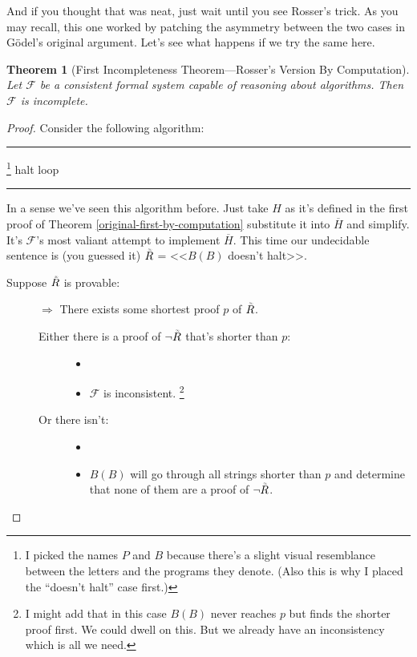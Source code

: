 \documentclass{article}
\newtheorem{theorem}{Theorem}
\newcommand{\F}{\ensuremath{\mathcal{F}}}
\newcommand{\iRosser}{\ensuremath{\accentset{\scalebox{0.35}{$\infty$}}{R}}}
\newenvironment{algo}{\begin{samepage}\medskip\hrule\begin{algorithmic}[H]}{\end{algorithmic}\hrule\medskip\end{samepage}}
\begin{document}
And if you thought that was neat, just wait until you see Rosser's trick. As you may recall, this one worked by patching the asymmetry between the two cases in Gödel's original argument. Let's see what happens if we try the same here.

\begin{theorem}[First Incompleteness Theorem---Rosser's Version By Computation]
Let $\F$ be a consistent formal system capable of reasoning about algorithms. Then $\F$ is incomplete.
\end{theorem}

\begin{proof}
Consider the following algorithm:
\begin{algo}
\footnote{I picked the names $P$ and $B$ because there's a slight visual resemblance between the letters and the programs they denote. (Also this is why I placed the ``doesn't halt'' case first.)}
      \State halt
    \EndIf
      \State loop
    \EndIf
  \EndFor
\EndFunction
\end{algo}
In a sense we've seen this algorithm before. Just take $H$ as it's defined in the first proof of Theorem \ref{original-first-by-computation} substitute it into $\overline{H}$ and simplify. It's $\F$'s most valiant attempt to implement $\overline{H}$. This time our undecidable sentence is (you guessed it) $\iRosser$ = <<$B(B)$ doesn't halt>>.
\begin{description}
\item[Suppose $\iRosser$ is provable:]
$\Rightarrow$ There exists some shortest proof $p$ of $\iRosser$.
\begin{description}
\item[Either there is a proof of $\neg \iRosser$ that's shorter than $p$:]
\begin{itemize}
\item[]
\item $\F$ is inconsistent. \lightning\footnote{I might add that in this case $B(B)$ never reaches $p$ but finds the shorter proof first. We could dwell on this. But we already have an inconsistency which is all we need.}
\end{itemize}
\item[Or there isn't:]
\begin{itemize}
\item[]
\item $B(B)$ will go through all strings shorter than $p$ and determine that none of them are a proof of $\neg \iRosser$.

\end{itemize}
\end{description}
\end{description}
\end{proof}
\end{document}
